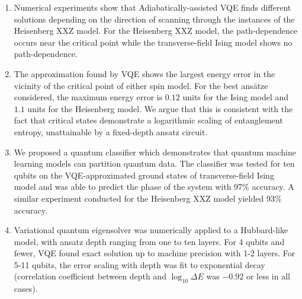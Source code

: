 \begin{enumerate}

    \item Numerical experiments show that Adiabatically-assisted VQE finds different solutions depending on the direction of scanning through the instances of the Heisenberg XXZ model. For the Heisenberg XXZ model, the path-dependence occurs near the critical point while the transverse-field Ising model shows no path-dependence.
    \item The approximation found by VQE shows the largest energy error in the vicinity of the critical point of either spin model. For the best ans\"atze considered, the maximum energy error is $0.12$ units for the Ising model and $1.1$ units for the Heisenberg model. We argue that this is consistent with the fact that critical states demonstrate a logarithmic scaling of entanglement entropy, 
    unattainable by a fixed-depth ansatz circuit.
    \item We proposed a quantum classifier which demonstrates that quantum machine learning models can partition quantum data. The classifier was tested for ten qubits on the VQE-approximated ground states of transverse-field Ising model and was able to predict the phase of the system with 97\% accuracy. A similar experiment conducted for the Heisenberg XXZ model yielded 93\% accuracy.

    \item Variational quantum eigensolver was numerically applied to a Hubbard-like model, with ansatz depth ranging from one to ten layers. For 4 qubits and fewer, VQE found exact solution up to machine precision with 1-2 layers. For 5-11 qubits, the error scaling with depth was fit to exponential decay (correlation coefficient between depth and $\log_{10} \Delta E$ was $-0.92$ or less in all cases).
    

\end{enumerate}
